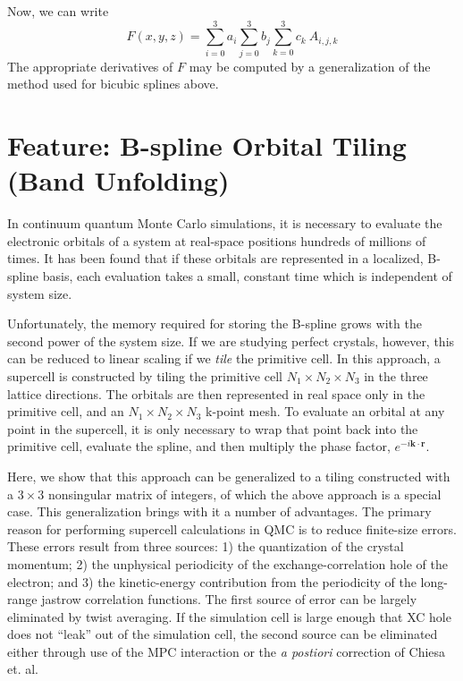 Now, we can write
\begin{equation}
F(x,y,z) = \sum_{i=0}^3 a_i \sum_{j=0}^3 b_j \sum_{k=0}^3 c_k \ A_{i,j,k} 
\end{equation}
The appropriate derivatives of $F$ may be computed by a generalization
of the method used for bicubic splines above.




\newpage
\section{Feature: B-spline Orbital Tiling (Band Unfolding)}


In continuum quantum Monte Carlo simulations, it is necessary to
evaluate the electronic orbitals of a system at real-space positions
hundreds of millions of times.  It has been found that if
these orbitals are represented in a localized, B-spline basis, each
evaluation takes a small, constant time which is independent of system
size.

Unfortunately, the memory required for storing the B-spline grows with
the second power of the system size.  If we are studying perfect
crystals, however, this can be reduced to linear scaling if we {\em
  tile} the primitive cell.  In this approach, 
a supercell is constructed by tiling the
primitive cell $N_1 \times N_2 \times N_3$ in the three lattice
directions.  The orbitals are then represented in real space only in
the primitive cell, and an $N_1 \times N_2 \times N_3$ k-point mesh.
To evaluate an orbital at any point in the supercell, it is only
necessary to wrap that point back into the primitive cell, evaluate
the spline, and then multiply the phase factor,
$e^{-i\mathbf{k}\cdot\mathbf{r}}$.  

Here, we show that this approach can be generalized to a tiling
constructed with a $3\times 3$ nonsingular matrix of integers, of which
the above approach is a special case.  This generalization brings with
it a number of advantages.  The primary reason for performing
supercell calculations in QMC is to reduce finite-size errors.  These
errors result from three sources:  1) the quantization of the crystal
momentum;  2) the unphysical periodicity of the exchange-correlation
hole of the electron; and 3) the kinetic-energy contribution from the
periodicity of the long-range jastrow correlation functions.  The first
source of error can be largely eliminated by twist averaging.  If the
simulation cell is large enough that XC hole does not ``leak'' out of
the simulation cell, the second source can be eliminated either
through use of the MPC interaction or the {\em a postiori} correction
of Chiesa et. al.  

